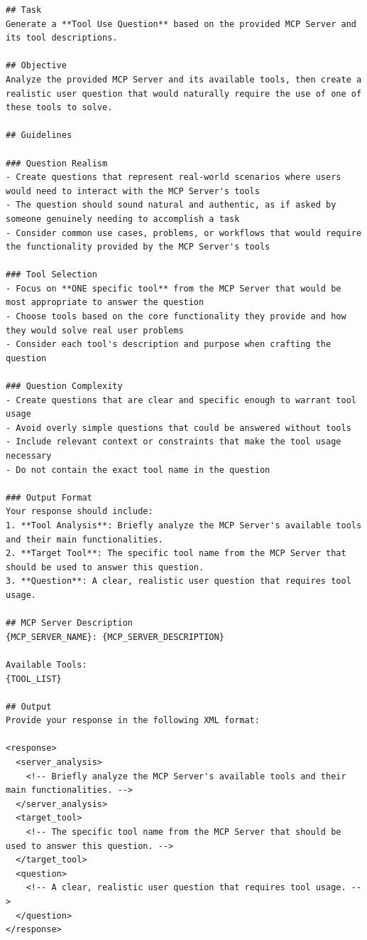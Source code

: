 \begin{verbatim}
## Task
Generate a **Tool Use Question** based on the provided MCP Server and its tool descriptions.

## Objective
Analyze the provided MCP Server and its available tools, then create a realistic user question that would naturally require the use of one of these tools to solve.

## Guidelines

### Question Realism
- Create questions that represent real-world scenarios where users would need to interact with the MCP Server's tools
- The question should sound natural and authentic, as if asked by someone genuinely needing to accomplish a task
- Consider common use cases, problems, or workflows that would require the functionality provided by the MCP Server's tools

### Tool Selection
- Focus on **ONE specific tool** from the MCP Server that would be most appropriate to answer the question
- Choose tools based on the core functionality they provide and how they would solve real user problems
- Consider each tool's description and purpose when crafting the question

### Question Complexity
- Create questions that are clear and specific enough to warrant tool usage
- Avoid overly simple questions that could be answered without tools
- Include relevant context or constraints that make the tool usage necessary
- Do not contain the exact tool name in the question

### Output Format
Your response should include:
1. **Tool Analysis**: Briefly analyze the MCP Server's available tools and their main functionalities.
2. **Target Tool**: The specific tool name from the MCP Server that should be used to answer this question.
3. **Question**: A clear, realistic user question that requires tool usage.

## MCP Server Description
{MCP_SERVER_NAME}: {MCP_SERVER_DESCRIPTION}

Available Tools:
{TOOL_LIST}

## Output
Provide your response in the following XML format:

<response>
  <server_analysis>
    <!-- Briefly analyze the MCP Server's available tools and their main functionalities. -->
  </server_analysis>
  <target_tool>
    <!-- The specific tool name from the MCP Server that should be used to answer this question. -->
  </target_tool>
  <question>
    <!-- A clear, realistic user question that requires tool usage. -->
  </question>
</response>
\end{verbatim}


